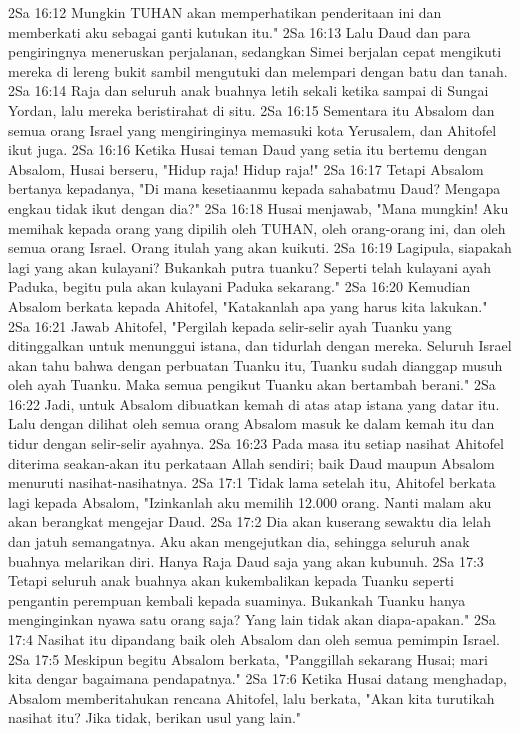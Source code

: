 2Sa 16:12  Mungkin TUHAN akan memperhatikan penderitaan ini dan memberkati aku sebagai ganti kutukan itu."
2Sa 16:13  Lalu Daud dan para pengiringnya meneruskan perjalanan, sedangkan Simei berjalan cepat mengikuti mereka di lereng bukit sambil mengutuki dan melempari dengan batu dan tanah.
2Sa 16:14  Raja dan seluruh anak buahnya letih sekali ketika sampai di Sungai Yordan, lalu mereka beristirahat di situ.
2Sa 16:15  Sementara itu Absalom dan semua orang Israel yang mengiringinya memasuki kota Yerusalem, dan Ahitofel ikut juga.
2Sa 16:16  Ketika Husai teman Daud yang setia itu bertemu dengan Absalom, Husai berseru, "Hidup raja! Hidup raja!"
2Sa 16:17  Tetapi Absalom bertanya kepadanya, "Di mana kesetiaanmu kepada sahabatmu Daud? Mengapa engkau tidak ikut dengan dia?"
2Sa 16:18  Husai menjawab, "Mana mungkin! Aku memihak kepada orang yang dipilih oleh TUHAN, oleh orang-orang ini, dan oleh semua orang Israel. Orang itulah yang akan kuikuti.
2Sa 16:19  Lagipula, siapakah lagi yang akan kulayani? Bukankah putra tuanku? Seperti telah kulayani ayah Paduka, begitu pula akan kulayani Paduka sekarang."
2Sa 16:20  Kemudian Absalom berkata kepada Ahitofel, "Katakanlah apa yang harus kita lakukan."
2Sa 16:21  Jawab Ahitofel, "Pergilah kepada selir-selir ayah Tuanku yang ditinggalkan untuk menunggui istana, dan tidurlah dengan mereka. Seluruh Israel akan tahu bahwa dengan perbuatan Tuanku itu, Tuanku sudah dianggap musuh oleh ayah Tuanku. Maka semua pengikut Tuanku akan bertambah berani."
2Sa 16:22  Jadi, untuk Absalom dibuatkan kemah di atas atap istana yang datar itu. Lalu dengan dilihat oleh semua orang Absalom masuk ke dalam kemah itu dan tidur dengan selir-selir ayahnya.
2Sa 16:23  Pada masa itu setiap nasihat Ahitofel diterima seakan-akan itu perkataan Allah sendiri; baik Daud maupun Absalom menuruti nasihat-nasihatnya.
2Sa 17:1  Tidak lama setelah itu, Ahitofel berkata lagi kepada Absalom, "Izinkanlah aku memilih 12.000 orang. Nanti malam aku akan berangkat mengejar Daud.
2Sa 17:2  Dia akan kuserang sewaktu dia lelah dan jatuh semangatnya. Aku akan mengejutkan dia, sehingga seluruh anak buahnya melarikan diri. Hanya Raja Daud saja yang akan kubunuh.
2Sa 17:3  Tetapi seluruh anak buahnya akan kukembalikan kepada Tuanku seperti pengantin perempuan kembali kepada suaminya. Bukankah Tuanku hanya menginginkan nyawa satu orang saja? Yang lain tidak akan diapa-apakan."
2Sa 17:4  Nasihat itu dipandang baik oleh Absalom dan oleh semua pemimpin Israel.
2Sa 17:5  Meskipun begitu Absalom berkata, "Panggillah sekarang Husai; mari kita dengar bagaimana pendapatnya."
2Sa 17:6  Ketika Husai datang menghadap, Absalom memberitahukan rencana Ahitofel, lalu berkata, "Akan kita turutikah nasihat itu? Jika tidak, berikan usul yang lain."
